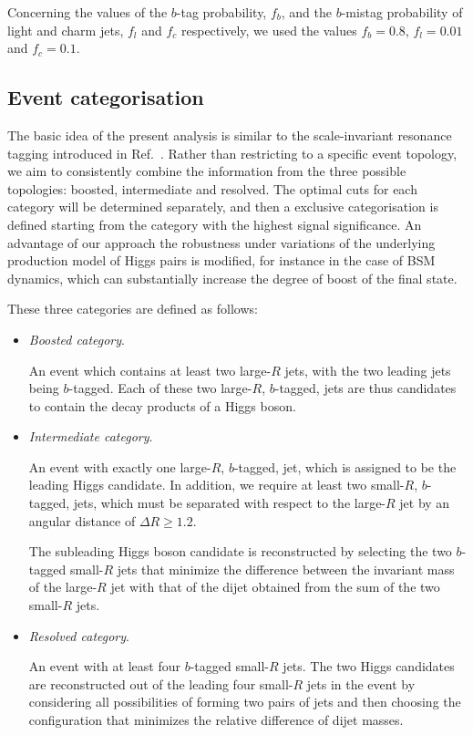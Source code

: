 Concerning the values of the $b$-tag probability, $f_b$, and
the $b$-mistag probability of light and charm jets, $f_l$ and  $f_c$
respectively,
we used the values $f_b=0.8$, $f_l=0.01$
and  $f_c=0.1$.





\subsection{Event categorisation}
\label{sec:categorisation}

The basic idea of the present analysis is similar to the
scale-invariant resonance tagging introduced
in Ref.~\cite{Gouzevitch:2013qca}.
%
Rather than restricting to a specific event topology,
we aim to consistently combine the information from
the three possible topologies: boosted, intermediate and
resolved.
%
The optimal cuts for each category will be determined
separately, and then
a exclusive categorisation is defined starting from the category
with the highest signal significance.
%
An advantage of our approach
the robustness under variations of
the underlying production model of Higgs pairs is modified,
for instance in the case of
BSM dynamics, which can substantially increase
the degree of boost of the final state.


These three categories are defined as follows:
\begin{itemize}
\item {\it Boosted category}.

  An event which
  contains at least two large-$R$ jets, with the two leading jets
 being $b$-tagged.
 Each of these two large-$R$, $b$-tagged, jets are 
 thus candidates
 to contain the decay products of a Higgs boson.

\item {\it Intermediate category}.

  An event with exactly one large-$R$, $b$-tagged, jet, which
  is assigned to be the leading Higgs candidate.
  In addition, we require at least two small-$R$, $b$-tagged, jets,
  which must be separated with respect to the large-$R$ jet
  by an angular distance of $\Delta R\ge 1.2$.
    
  The subleading Higgs boson candidate is reconstructed
  by selecting the two $b$-tagged small-$R$ jets that minimize the difference
  between the invariant mass of the large-$R$ jet
  with that of the dijet obtained
  from the sum of the two small-$R$ jets.
  
\item {\it Resolved category}.

  
 An event with at least
  four $b$-tagged small-$R$ jets.
  The two Higgs candidates are reconstructed out of the
  leading four small-$R$ jets in the event
  by considering all possibilities of forming two pairs of jets
  and then choosing the configuration that minimizes the relative difference of
  dijet masses.
  
\end{itemize}



